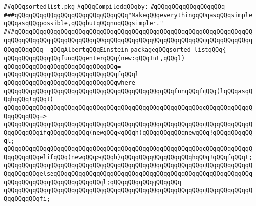 \label{src/lib/compiler/back/low/library/sorted-list.pkg}
\verb|##qQQqsortedlist.pkg|\newline
\newline
\verb|#qQQqCompiledqQQqby:|\newline
\verb|#qQQqqQQqqQQqqQQqqQQq|\newline
\newline
\newline
\newline
\verb|###qQQqqQQqqQQqqQQqqQQqqQQqqQQqqQQq"MakeqQQqeverythingqQQqasqQQqsimpleqQQqasqQQqpossible,qQQqbutqQQqnoqQQqsimpler."|\newline
\verb|###qQQqqQQqqQQqqQQqqQQqqQQqqQQqqQQqqQQqqQQqqQQqqQQqqQQqqQQqqQQqqQQqqQQqqQQqqQQqqQQqqQQqqQQqqQQqqQQqqQQqqQQqqQQqqQQqqQQqqQQqqQQqqQQqqQQqqQQqqQQqqQQqqQQq--qQQqAlbertqQQqEinstein|\newline
\newline
\newline
\newline
\verb|packageqQQqsorted_listqQQq{|\newline
\newline
\verb|qQQqqQQqqQQqqQQqfunqQQqenterqQQq(new:qQQqInt,qQQql)|\newline
\verb|qQQqqQQqqQQqqQQqqQQqqQQqqQQqqQQq=|\newline
\verb|qQQqqQQqqQQqqQQqqQQqqQQqqQQqqQQqfqQQql|\newline
\verb|qQQqqQQqqQQqqQQqqQQqqQQqqQQqqQQqwhere|\newline
\verb|qQQqqQQqqQQqqQQqqQQqqQQqqQQqqQQqqQQqqQQqqQQqqQQqfunqQQqfqQQq(lqQQqasqQQqhqQQq!qQQqt)|\newline
\verb|qQQqqQQqqQQqqQQqqQQqqQQqqQQqqQQqqQQqqQQqqQQqqQQqqQQqqQQqqQQqqQQqqQQqqQQqqQQqqQQq=>|\newline
\verb|qQQqqQQqqQQqqQQqqQQqqQQqqQQqqQQqqQQqqQQqqQQqqQQqqQQqqQQqqQQqqQQqqQQqqQQqqQQqqQQqifqQQqqQQqqQQq(newqQQq<qQQqh)qQQqqQQqqQQqnewqQQq!qQQqqQQqqQQql;|\newline
\verb|qQQqqQQqqQQqqQQqqQQqqQQqqQQqqQQqqQQqqQQqqQQqqQQqqQQqqQQqqQQqqQQqqQQqqQQqqQQqqQQqelifqQQq(newqQQq>qQQqh)qQQqqQQqqQQqqQQqqQQqhqQQq!qQQqfqQQqt;|\newline
\verb|qQQqqQQqqQQqqQQqqQQqqQQqqQQqqQQqqQQqqQQqqQQqqQQqqQQqqQQqqQQqqQQqqQQqqQQqqQQqqQQqelseqQQqqQQqqQQqqQQqqQQqqQQqqQQqqQQqqQQqqQQqqQQqqQQqqQQqqQQqqQQqqQQqqQQqqQQqqQQqqQQqqQQql;qQQqqQQqqQQqqQQqqQQq|\newline
\verb|qQQqqQQqqQQqqQQqqQQqqQQqqQQqqQQqqQQqqQQqqQQqqQQqqQQqqQQqqQQqqQQqqQQqqQQqqQQqqQQqfi;|\newline
